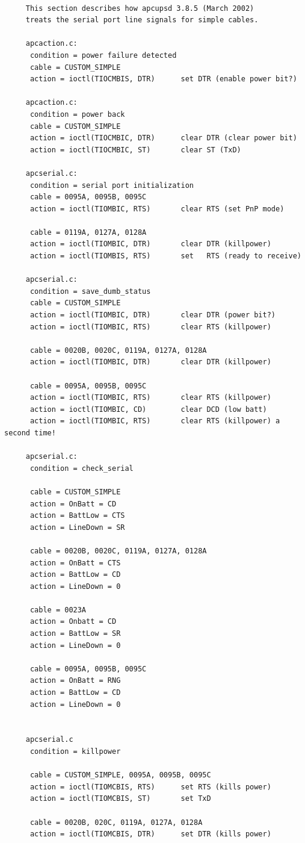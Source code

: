\footnotesize
\begin{verbatim}
     
     This section describes how apcupsd 3.8.5 (March 2002)
     treats the serial port line signals for simple cables.
     
     apcaction.c:
      condition = power failure detected
      cable = CUSTOM_SIMPLE
      action = ioctl(TIOCMBIS, DTR)      set DTR (enable power bit?)
     
     apcaction.c:
      condition = power back
      cable = CUSTOM_SIMPLE
      action = ioctl(TIOCMBIC, DTR)      clear DTR (clear power bit)
      action = ioctl(TIOCMBIC, ST)       clear ST (TxD)
     
     apcserial.c:
      condition = serial port initialization
      cable = 0095A, 0095B, 0095C
      action = ioctl(TIOMBIC, RTS)       clear RTS (set PnP mode)
     
      cable = 0119A, 0127A, 0128A
      action = ioctl(TIOMBIC, DTR)       clear DTR (killpower)
      action = ioctl(TIOMBIS, RTS)       set   RTS (ready to receive)
     
     apcserial.c:
      condition = save_dumb_status
      cable = CUSTOM_SIMPLE
      action = ioctl(TIOMBIC, DTR)       clear DTR (power bit?)
      action = ioctl(TIOMBIC, RTS)       clear RTS (killpower)
     
      cable = 0020B, 0020C, 0119A, 0127A, 0128A
      action = ioctl(TIOMBIC, DTR)       clear DTR (killpower)
     
      cable = 0095A, 0095B, 0095C
      action = ioctl(TIOMBIC, RTS)       clear RTS (killpower)
      action = ioctl(TIOMBIC, CD)        clear DCD (low batt)
      action = ioctl(TIOMBIC, RTS)       clear RTS (killpower) a second time!
     
     apcserial.c:
      condition = check_serial
     
      cable = CUSTOM_SIMPLE
      action = OnBatt = CD
      action = BattLow = CTS
      action = LineDown = SR
     
      cable = 0020B, 0020C, 0119A, 0127A, 0128A
      action = OnBatt = CTS
      action = BattLow = CD
      action = LineDown = 0
     
      cable = 0023A
      action = Onbatt = CD
      action = BattLow = SR
      action = LineDown = 0
     
      cable = 0095A, 0095B, 0095C
      action = OnBatt = RNG
      action = BattLow = CD
      action = LineDown = 0
     
     
     apcserial.c
      condition = killpower
     
      cable = CUSTOM_SIMPLE, 0095A, 0095B, 0095C
      action = ioctl(TIOMCBIS, RTS)      set RTS (kills power)
      action = ioctl(TIOMCBIS, ST)       set TxD
     
      cable = 0020B, 020C, 0119A, 0127A, 0128A
      action = ioctl(TIOMCBIS, DTR)      set DTR (kills power)
     
\end{verbatim}
\normalsize

